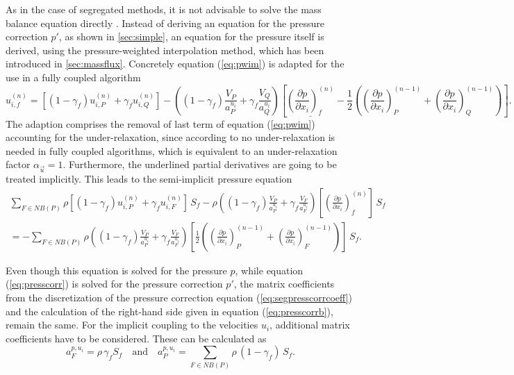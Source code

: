 As in the case of segregated methods, it is not advisable to solve the mass balance equation directly \cite{schaefer99}. Instead of deriving an equation for the pressure correction \(p'\), as shown in \ref{sec:simple}, an equation for the pressure itself is derived, using the pressure-weighted interpolation method, which has been introduced in \ref{sec:massflux}. Concretely equation (\ref{eq:pwim}) is adapted for the use in a fully coupled algorithm
\begin{displaymath}
  u_{i,f}^{(n)} 
  =
  \left[\left(1 - \gamma_f\right) u_{i,P}^{(n)} + \gamma_f u_{i,Q}^{(n)} \right]
  - \left(\left(1 - \gamma_f\right) \frac{V_P}{a_P^{u_i}} + \gamma_f \frac{ V_Q}{a_Q^{u_i}}\right)
  \left[ 
    \underline{ \left(\frac{\partial p}{\partial x_i}\right)_f^{(n)}}
  - \frac{1}{2} 
  \left( 
    \left( \frac{\partial p}{\partial x_i} \right)_P^{(n-1)} 
  + \left(\frac{\partial p}{\partial x_i}\right)_Q^{(n-1)} 
  \right)
  \right].
\end{displaymath}
The adaption comprises the removal of last term of equation (\ref{eq:pwim}) accounting for the under-relaxation, since according to \cite{darwish09} no under-relaxation is needed in fully coupled algorithms, which is equivalent to an under-relaxation factor \(\alpha_\vec{u} = 1\). Furthermore, the underlined partial derivatives are going to be treated implicitly. This leads to the semi-implicit pressure equation
\begin{align*}
  \sum_{F \in NB(P)} 
  \rho
  \left[\left(1 - \gamma_f\right) u_{i,P}^{(n)} + \gamma_f u_{i,F}^{(n)} \right]\,  S_f
  - \rho \left(\left(1 - \gamma_f\right) \frac{ V_P}{a_P^{u_i}} + \gamma_f \frac{ V_F}{a_F^{u_i}}\right)
  \left[ 
  \left(\frac{\partial p}{\partial x_i}\right)_f^{(n)}
  \right]\,  S_f \nonumber \\
  =
  - \sum_{F \in NB(P)}
  \rho
  \left(\left(1 - \gamma_f\right) \frac{ V_P}{a_P^{u_i}} + \gamma_f \frac{ V_F}{a_F^{u_i}}\right)
  \left[ 
  \frac{1}{2} 
  \left( 
    \left( \frac{\partial p}{\partial x_i} \right)_P^{(n-1)} 
  + \left(\frac{\partial p}{\partial x_i}\right)_F^{(n-1)} 
  \right)
  \right] \, S_f.
\end{align*}

Even though this equation is solved for the pressure \(p\), while equation (\ref{eq:presscorr}) is solved for the pressure correction \(p'\), the matrix coefficients from the discretization of the pressure correction equation (\ref{eq:segpresscorrcoeff}) and the calculation of the right-hand side given in equation (\ref{eq:presscorrb}), remain the same. For the implicit coupling to the velocities \(u_i\), additional matrix coefficients have to be considered. These can be calculated as
\begin{displaymath}
  a_F^{p,u_i} = \rho \, \gamma_f S_f \quad \text{and} \quad a_P^{p,u_i} = \sum_{F \in NB(P)} \rho \, (1-\gamma_f) \, S_f.
\end{displaymath}

